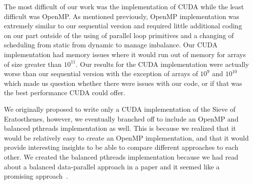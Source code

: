 \documentclass[11pt,twocolumn]{article}
\begin{document}
The most difficult of our work was the implementation of CUDA
while the least difficult was OpenMP. As mentioned previously,
OpenMP implementation was extremely similar to our sequential version and 
required little additional coding on our part outside of the using of
parallel loop primitives and a changing of scheduling from static from dynamic
to manage imbalance. Our CUDA implementation had memory issues where it
would run out of memory for arrays of size greater than $10^{11}$. Our results 
for the CUDA 
implementation were actually worse than our sequential version with the 
exception of arrays of $10^9$ and $10^{10}$ which made us question whether
there were issues with our code, or if that was the best performance CUDA 
could offer. 

We originally proposed to write only a CUDA implementation of the Sieve of 
Eratosthenes, however, we eventually branched off to include an OpenMP
and balanced pthreads implementation as well. This is because we realized
that it would be relatively easy to create an OpenMP implementation, and
that it would provide interesting insights to be able to compare
different approaches to each other. We created the balanced pthreads
implementation because we had read about a balanced data-parallel
approach in a paper and it seemed like a promising approach~\cite{Bhat}.







\end{document}
